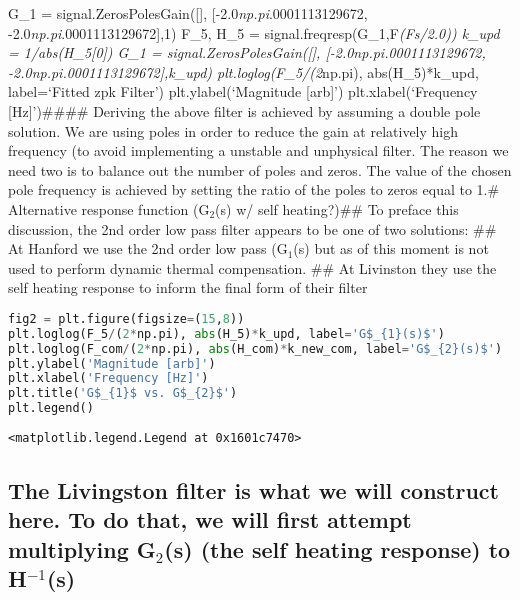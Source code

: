 G\_1 = signal.ZerosPolesGain({[}{]}, {[}-2.0\emph{np.pi}.0001113129672,
-2.0\emph{np.pi}.0001113129672{]},1) F\_5, H\_5 =
signal.freqresp(G\_1,F\emph{(Fs/2.0)) k\_upd = 1/abs(H\_5{[}0{]}) G\_1 =
signal.ZerosPolesGain({[}{]}, {[}-2.0\emph{np.pi}.0001113129672,
-2.0\emph{np.pi}.0001113129672{]},k\_upd) plt.loglog(F\_5/(2}np.pi),
abs(H\_5)*k\_upd, label=`Fitted zpk Filter') plt.ylabel(`Magnitude
{[}arb{]}') plt.xlabel(`Frequency {[}Hz{]}')\#\#\#\# Deriving the above
filter is achieved by assuming a double pole solution. We are using
poles in order to reduce the gain at relatively high frequency (to avoid
implementing a unstable and unphysical filter. The reason we need two is
to balance out the number of poles and zeros. The value of the chosen
pole frequency is achieved by setting the ratio of the poles to zeros
equal to 1.\# Alternative response function (G\(_{2}\)(s) w/ self
heating?)\#\# To preface this discussion, the 2nd order low pass filter
appears to be one of two solutions: \#\# At Hanford we use the 2nd order
low pass (G\(_{1}\)(s) but as of this moment is not used to perform
dynamic thermal compensation. \#\# At Livinston they use the self
heating response to inform the final form of their filter

\begin{spacing}{1} \begin{lstlisting}[language=Python]
fig2 = plt.figure(figsize=(15,8))
plt.loglog(F_5/(2*np.pi), abs(H_5)*k_upd, label='G$_{1}(s)$')
plt.loglog(F_com/(2*np.pi), abs(H_com)*k_new_com, label='G$_{2}(s)$')
plt.ylabel('Magnitude [arb]')
plt.xlabel('Frequency [Hz]')
plt.title('G$_{1}$ vs. G$_{2}$')
plt.legend()
\end{lstlisting} \end{spacing}

\begin{spacing}{1} \begin{lstlisting}
<matplotlib.legend.Legend at 0x1601c7470>
\end{lstlisting} \end{spacing}


\hypertarget{the-livingston-filter-is-what-we-will-construct-here.-to-do-that-we-will-first-attempt-multiplying-g_2s-the-self-heating-response-to-h-1s}{%
\subsection{\texorpdfstring{The Livingston filter is what we will
construct here. To do that, we will first attempt multiplying
G\(_{2}\)(s) (the self heating response) to
H\(^{-1}\)(s)}{The Livingston filter is what we will construct here. To do that, we will first attempt multiplying G\_\{2\}(s) (the self heating response) to H\^{}\{-1\}(s)}}\label{the-livingston-filter-is-what-we-will-construct-here.-to-do-that-we-will-first-attempt-multiplying-g_2s-the-self-heating-response-to-h-1s}}


